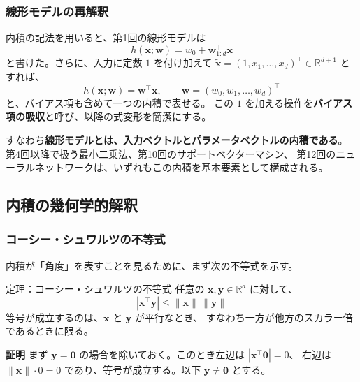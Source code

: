 \subsubsection{線形モデルの再解釈}

内積の記法を用いると、第1回の線形モデルは
\begin{equation}
  h(\bm{x}; \bm{w}) = w_0 + \bm{w}_{1:d}^\top \bm{x}
\end{equation}
と書けた。さらに、入力に定数 $1$ を付け加えて
$\tilde{\bm{x}} = (1, x_1, \ldots, x_d)^\top \in \mathbb{R}^{d+1}$ とすれば、
\begin{equation}
  h(\bm{x}; \bm{w}) = \bm{w}^\top \tilde{\bm{x}}, \qquad \bm{w} = (w_0, w_1, \ldots, w_d)^\top
\end{equation}
と、バイアス項も含めて一つの内積で表せる。
この $1$ を加える操作を\textbf{バイアス項の吸収}と呼び、以降の式変形を簡潔にする。

すなわち\textbf{線形モデルとは、入力ベクトルとパラメータベクトルの内積である}。
第4回以降で扱う最小二乗法、第10回のサポートベクターマシン、
第12回のニューラルネットワークは、いずれもこの内積を基本要素として構成される。


\subsection{内積の幾何学的解釈}

\subsubsection{コーシー・シュワルツの不等式}

内積が「角度」を表すことを見るために、まず次の不等式を示す。

\begin{itembox}[l]{定理：コーシー・シュワルツの不等式}
任意の $\bm{x}, \bm{y} \in \mathbb{R}^d$ に対して、
\begin{equation}
  |\bm{x}^\top \bm{y}| \leq \|\bm{x}\| \, \|\bm{y}\|
\end{equation}
等号が成立するのは、$\bm{x}$ と $\bm{y}$ が平行なとき、
すなわち一方が他方のスカラー倍であるときに限る。
\end{itembox}

\noindent
\textbf{証明}\quad
まず $\bm{y} = \bm{0}$ の場合を除いておく。このとき左辺は $|\bm{x}^\top \bm{0}| = 0$、
右辺は $\|\bm{x}\| \cdot 0 = 0$ であり、等号が成立する。以下 $\bm{y} \neq \bm{0}$ とする。

